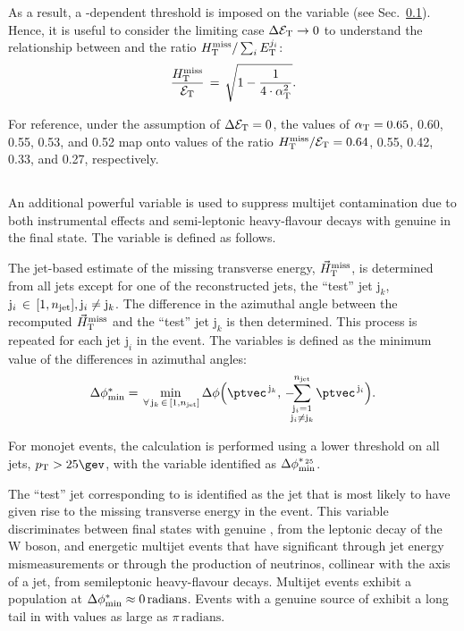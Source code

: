 As a result, a \scalht-dependent threshold is imposed on the \alphat
variable (see Sec.~\ref{}). Hence, it is useful to consider the
limiting case $\Delta\mathcal{E}_\mathrm{T} \rightarrow 0$ to understand the relationship
between \alphat and the ratio $\mbox{$H_{\rm T}^{\rm miss}$}/\sum_{i} E_\textrm{T}^{j_i}$: 
\begin{equation}
  \label{eq:alphat3}
  \frac{\mbox{$H_{\rm T}^{\rm miss}$}}{\mathcal{E}_\mathrm{T}} \, = \, \sqrt{ 1 - \frac{1}{4 \cdot \alpha_{\text{T}}^2} }.
\end{equation}

For reference, under the assumption of $\Delta\mathcal{E}_\mathrm{T} = 0$, the values of
$\alpha_{\text{T}} = 0.65$, 0.60, 0.55, 0.53, and 0.52 map onto values of the
ratio $\mbox{$H_{\rm T}^{\rm miss}$}/\mathcal{E}_\mathrm{T} = 0.64$, 0.55, 0.42, 0.33, and 0.27, respectively.

\subsection{\bdphi}

An additional powerful variable \bdphi is used to suppress multijet
contamination due to both instrumental effects and semi-leptonic
heavy-flavour decays with genuine \met in the final state. The
variable is defined as follows. 

The jet-based estimate
of the missing transverse energy, ${\mbox{$\vec{H}_{\rm T}^{\rm miss}$}}$, is determined from all
jets except for one of the reconstructed jets, the ``test'' jet
$\mathrm{j}_k$, \ie $\mathrm{j}_i \,\in\, [1,n_{\text{jet}}], \mathrm{j}_i \ne
\mathrm{j}_k$. The difference in the azimuthal angle between the
recomputed $\mbox{$\vec{H}_{\rm T}^{\rm miss}$}$ and the ``test'' jet $\mathrm{j}_k$ is then
determined. This process is repeated for each jet $\mathrm{j}_i$ in
the event. The \bdphi variables is defined as the minimum value of the
differences in azimuthal angles: 
\begin{equation}
  \bdphi = \min_{\,\forall\, \mathrm{j}_k\,\in\, [1,\njet]}
  \Delta\phi \Bigl( \ptvec^{\,\mathrm{j}_k}, \,
    -\hspace{-0.5em}\sum_{\substack{\mathrm{j}_i= 1 \\ \mathrm{j}_i \ne \mathrm{j}_k}}^{\njet}
    \ptvec^{\,\mathrm{j}_i} \Bigr).
  \label{eq:bdphi}
\end{equation}

For monojet events, the calculation is performed using a lower \Pt
threshold on all jets, $\Pt > 25\gev$, with the variable identified as
$\mbox{$\Delta\phi^{*_{\, 25}}_{\rm min}$}$.

The ``test'' jet corresponding to \bdphi is identified as the jet that
is most likely to have given rise to the missing transverse energy in
the event. This variable discriminates between final states with
genuine \ptvecmiss, \eg from the leptonic decay of the W boson, and
energetic multijet events that have significant \ptvecmiss through jet
energy mismeasurements or through the production of neutrinos,
collinear with the axis of a jet, from semileptonic heavy-flavour
decays. Multijet events exhibit a population at $\mbox{$\Delta\phi^{*}_{\rm min}$} \approx
0\,\mathrm{radians}$. Events with a genuine source of \ptvecmiss
exhibit a long tail in \bdphi with values as large as
$\pi\,\mathrm{radians}$. 

